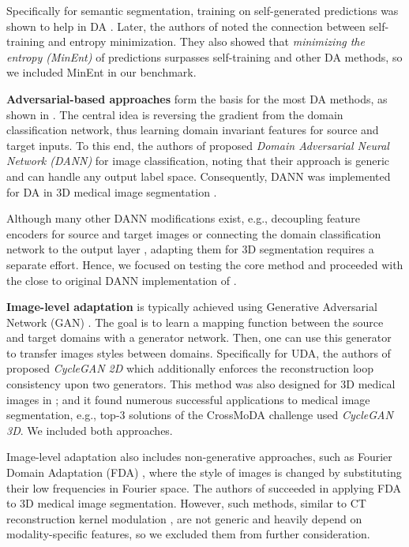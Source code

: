 Specifically for semantic segmentation, training on self-generated predictions was shown to help in DA \cite{self_training}. Later, the authors of \cite{entropy} noted the connection between self-training and entropy minimization. They also showed that \textit{minimizing the entropy (MinEnt)} of predictions surpasses self-training and other DA methods, so we included MinEnt in our benchmark.


\textbf{Adversarial-based approaches} form the basis for the most DA methods, as shown in \cite{uda_segm_review_2020}. The central idea is reversing the gradient from the domain classification network, thus learning domain invariant features for source and target inputs. To this end, the authors of \cite{dann} proposed \textit{Domain Adversarial Neural Network (DANN)} for image classification, noting that their approach is generic and can handle any output label space. Consequently, DANN was implemented for DA in 3D medical image segmentation \cite{dann_medim}.

Although many other DANN modifications exist, e.g., decoupling feature encoders for source and target images \cite{adda} or connecting the domain classification network to the output layer \cite{tsai2018learning}, adapting them for 3D segmentation requires a separate effort. Hence, we focused on testing the core method and proceeded with the close to original DANN implementation of \cite{dann_medim}.


\textbf{Image-level adaptation} is typically achieved using Generative Adversarial Network (GAN) \cite{goodfellow2020generative}. The goal is to learn a mapping function between the source and target domains with a generator network. Then, one can use this generator to transfer images styles between domains. Specifically for UDA, the authors of \cite{cyclegan} proposed \textit{CycleGAN 2D} which additionally enforces the reconstruction loop consistency upon two generators. This method was also designed for 3D medical images in \cite{cyclegan3d}; and it found numerous successful applications to medical image segmentation, e.g., top-3 solutions of the CrossMoDA challenge \cite{crossmoda} used \textit{CycleGAN 3D}. We included both approaches.

Image-level adaptation also includes non-generative approaches, such as Fourier Domain Adaptation (FDA) \cite{fda}, where the style of images is changed by substituting their low frequencies in Fourier space. The authors of \cite{fda_medim} succeeded in applying FDA to 3D medical image segmentation. However, such methods, similar to CT reconstruction kernel modulation \cite{fbpaug}, are not generic and heavily depend on modality-specific features, so we excluded them from further consideration.


